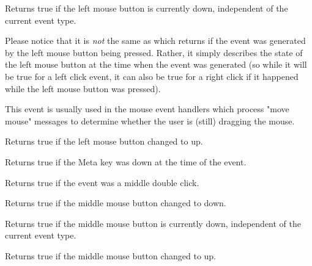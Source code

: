 
Returns true if the left mouse button is currently down, independent
of the current event type.

Please notice that it is \emph{not} the same as 
 which returns \true if the event was
generated by the left mouse button being pressed. Rather, it simply describes
the state of the left mouse button at the time when the event was generated
(so while it will be true for a left click event, it can also be true for
a right click if it happened while the left mouse button was pressed).

This event is usually used in the mouse event handlers which process "move
mouse" messages to determine whether the user is (still) dragging the mouse.


\label{wxmouseeventleftup}


Returns true if the left mouse button changed to up.


\label{wxmouseeventmetadown}


Returns true if the Meta key was down at the time of the event.


\label{wxmouseeventmiddledclick}


Returns true if the event was a middle double click.


\label{wxmouseeventmiddledown}


Returns true if the middle mouse button changed to down.


\label{wxmouseeventmiddleisdown}


Returns true if the middle mouse button is currently down, independent
of the current event type.


\label{wxmouseeventmiddleup}


Returns true if the middle mouse button changed to up.



